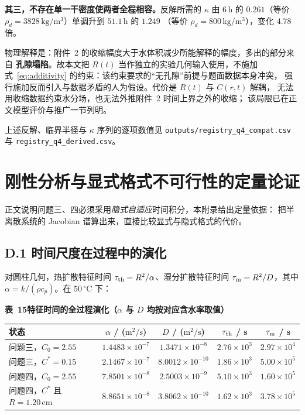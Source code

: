 \documentclass[withoutpreface,bwprint]{cumcmthesis} %
\begin{document}
\begin{appendices}
\textbf{其三，不存在单一干密度使两者全程相容。}反解所需的 $\kappa$ 由 $6\,\mathrm{h}$ 的
$0.261$（等价 $\rho_d=3828\,\mathrm{kg/m^3}$）单调升到 $51.1\,\mathrm{h}$ 的 $1.249$
（等价 $\rho_d=800\,\mathrm{kg/m^3}$），变化 $4.78$ 倍。

物理解释是：附件~2 的收缩幅度大于水体积减少所能解释的幅度，多出的部分来自
\textbf{孔隙塌陷}。故本文把 $R(t)$ 当作独立的实验几何输入使用，不施加
式~\eqref{eq:additivity} 的约束：该约束要求的``无孔隙''前提与题面数据本身冲突，
强行施加反而引入与数据矛盾的人为假设。代价是 $R(t)$ 与 $C(r,t)$ 解耦，
无法用收缩数据约束水分场，也无法外推附件~2 时间上界之外的收缩；
该局限已在正文模型评价与推广一节列明。

上述反解、临界半径与 $\kappa$ 序列的逐项数值见
\texttt{outputs/registry\_q4\_compat.csv} 与 \texttt{registry\_q4\_derived.csv}。

\section{刚性分析与显式格式不可行性的定量论证}
\label{app:stiff}

正文说明问题三、四必须采用\emph{隐式自适应}时间积分，本附录给出定量依据：
把半离散系统的 Jacobian 谱算出来，直接比较显式与隐式格式的代价。

\subsection*{D.1 时间尺度在过程中的演化}

对圆柱几何，热扩散特征时间 $\tau_{\rm th}=R^2/\alpha$、湿分扩散特征时间
$\tau_{\rm m}=R^2/D$，其中 $\alpha=k/(\rho c_p)$。在 $50\,^\circ\mathrm{C}$ 下：

\begin{table}[htbp]
\centering
\begin{minipage}{0.94\textwidth}
\centering\small
\textbf{表~15\quad 特征时间的全过程演化（$\alpha$ 与 $D$ 均按对应含水率取值）}\\[3pt]
\begin{tabular}{lcccc}
\toprule
状态 & $\alpha$ / ($\mathrm{m^2/s}$) & $D$ / ($\mathrm{m^2/s}$)
 & $\tau_{\rm th}$ / s & $\tau_{\rm m}$ / s \\
\midrule
问题三，$C_0=2.55$ & $1.4483\times10^{-7}$ & $1.3471\times10^{-8}$
 & $2.76\times10^3$ & $2.97\times10^4$ \\
问题三，$C^*=0.15$ & $2.1467\times10^{-7}$ & $8.0012\times10^{-10}$
 & $1.86\times10^3$ & $5.00\times10^5$ \\
问题四，$C_0=2.55$ & $7.8501\times10^{-8}$ & $2.5003\times10^{-9}$
 & $5.10\times10^3$ & $1.60\times10^5$ \\
问题四，$C^*$ 且 $R=1.20\,\mathrm{cm}$ & $8.8651\times10^{-8}$
 & $3.8062\times10^{-10}$ & $1.62\times10^3$ & $3.78\times10^5$ \\
\bottomrule
\end{tabular}
\end{minipage}
\end{table}


\end{appendices}
\end{document}
